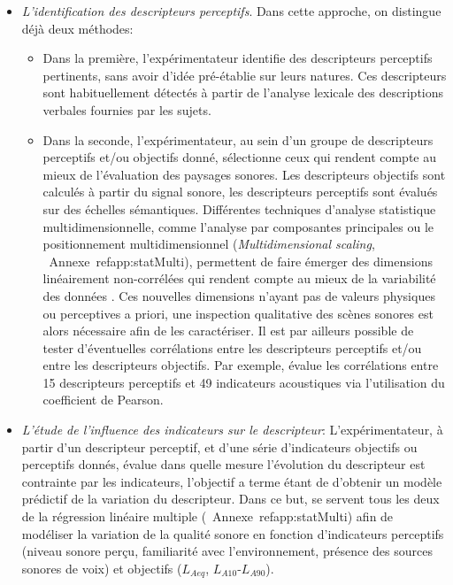 \begin{itemize}

\item \emph{L'identification des descripteurs perceptifs}. Dans cette approche, on distingue déjà deux méthodes:

\begin{itemize}
\item Dans la première, l'expérimentateur identifie des descripteurs perceptifs pertinents, sans avoir d'idée pré-établie sur leurs natures. Ces descripteurs sont habituellement détectés à partir de l'analyse lexicale des descriptions verbales fournies par les sujets.

\item Dans la seconde, l'expérimentateur, au sein d'un groupe de descripteurs perceptifs et/ou objectifs donné, sélectionne ceux qui rendent compte au mieux de l'évaluation des paysages sonores. Les descripteurs objectifs sont calculés à partir du signal sonore, les descripteurs perceptifs sont évalués sur des échelles sémantiques. Différentes techniques d'analyse statistique multidimensionnelle, comme l'analyse par composantes principales ou le positionnement multidimensionnel (\emph{Multidimensional scaling}, \cf~Annexe~ref{app:statMulti}), permettent de faire émerger des dimensions linéairement non-corrélées qui rendent compte au mieux de la variabilité des données \citep{cain2013development,torija2013application}. Ces nouvelles dimensions n'ayant pas de valeurs physiques ou perceptives a priori, une inspection qualitative des scènes sonores est alors nécessaire afin de les caractériser. Il est par ailleurs possible de tester d'éventuelles corrélations entre les descripteurs perceptifs et/ou entre les descripteurs objectifs. Par exemple, \citep{torija2013application} évalue les corrélations entre 15 descripteurs perceptifs et 49 indicateurs acoustiques via l'utilisation du coefficient de Pearson.
\end{itemize}

\item \emph{L'étude de l'influence des indicateurs sur le descripteur}: L'expérimentateur, à partir d'un descripteur perceptif, et d'une série d'indicateurs objectifs ou perceptifs donnés, évalue dans quelle mesure l'évolution du descripteur est contrainte par les indicateurs, l'objectif a terme étant de d'obtenir un modèle prédictif de la variation du descripteur. Dans ce but, \citep{lavandier2006contribution,ricciardi2015sound} se servent tous les deux de la régression linéaire multiple (\Cf~Annexe~ref{app:statMulti}) afin de modéliser la variation de la qualité sonore en fonction d'indicateurs perceptifs (niveau sonore perçu, familiarité avec l'environnement, présence des sources sonores de voix) et objectifs ($L_{Aeq}$, $L_{A10}$-$L_{A90}$).


\end{itemize}
